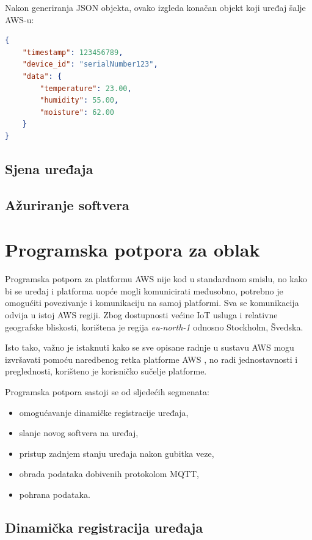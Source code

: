 Nakon generiranja JSON objekta, ovako izgleda konačan objekt koji uređaj šalje AWS-u:

\begin{lstlisting}[caption={JSON objekt za slanje na platformu}, language=json]
{
	"timestamp": 123456789,
	"device_id": "serialNumber123",
	"data": {
		"temperature": 23.00,
		"humidity": 55.00,
		"moisture": 62.00
	}
}
\end{lstlisting}

\subsection{Sjena uređaja}

\subsection{Ažuriranje softvera}

\section{Programska potpora za oblak}

Programska potpora za platformu AWS nije kod u standardnom smislu, no kako bi se uređaj i platforma uopće mogli komunicirati međusobno, potrebno je omogućiti povezivanje i komunikaciju na samoj platformi. Sva se komunikacija odvija u istoj AWS regiji. Zbog dostupnosti većine IoT usluga i relativne geografske bliskosti, korištena je regija \textit{eu-north-1} odnosno Stockholm, Švedska. 

Isto tako, važno je istaknuti kako se sve opisane radnje u sustavu AWS mogu izvršavati pomoću naredbenog retka platforme AWS , no radi jednostavnosti i preglednosti, korišteno je korisničko sučelje platforme.

Programska potpora sastoji se od sljedećih segmenata:
\begin{itemize}
	\item omogućavanje dinamičke registracije uređaja,
	\item slanje novog softvera na uređaj,
	\item pristup zadnjem stanju uređaja nakon gubitka veze,
	\item obrada podataka dobivenih protokolom MQTT,
	\item pohrana podataka.
\end{itemize}

\subsection{Dinamička registracija uređaja}

